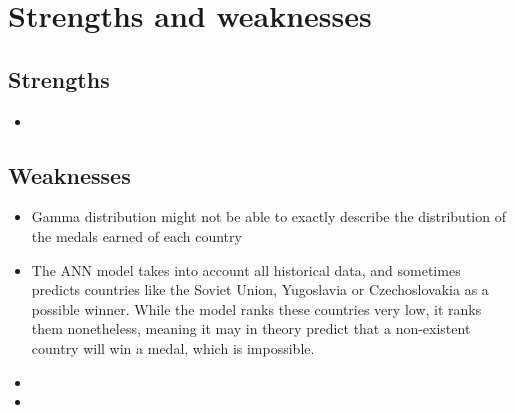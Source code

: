 \documentclass{mcmthesis}
\begin{document}
\section{Strengths and weaknesses}


\subsection{Strengths}
\begin{itemize}
\item{}
\end{itemize}

\subsection{Weaknesses}

\begin{itemize}
\item {Gamma distribution might not be able to exactly describe the distribution of the medals earned of each country}
\item {The ANN model takes into account all historical data, and sometimes predicts countries like the Soviet Union, Yugoslavia or Czechoslovakia as a possible winner. While the model ranks these countries very low, it ranks them nonetheless, meaning it may in theory predict that a non-existent country will win a medal, which is impossible.}
\item 

\item 

\end{itemize}

\printbibliography
\end{document}
